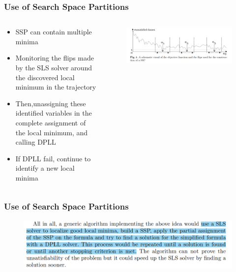 \documentclass[aspectratio=169%
,serif,mathserif]{beamer}
\begin{document}
\begin{frame}
	\frametitle{Use of Search Space Partitions}
	\begin{columns}
		\begin{column}{.45\textwidth}
			\begin{itemize}
				\item SSP can contain multiple minima
				\item Monitoring the flips made by the SLS solver around the discovered local minimum in the trajectory
				\item Then,unassigning these identified variables in the complete assignment of the local minimum, and calling DPLL
				\item If DPLL fail, continue to identify a new local minima
			\end{itemize}
		\end{column}

		\begin{column}{.55\textwidth}
			\begin{figure}[htbp]
				\includegraphics[width=1\linewidth]{5.png}
			\end{figure}
		\end{column}
	\end{columns}
\end{frame}

\begin{frame}
	\frametitle{Use of Search Space Partitions}
	\begin{figure}[htbp]
		\includegraphics[width=1\linewidth]{6.png}
	\end{figure}
\end{frame}
\end{document}
